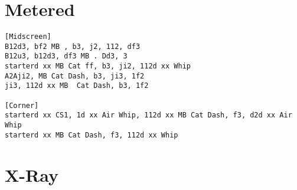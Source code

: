 \documentclass[main.tex]{subfiles}
\begin{document}
\section{Metered}


\begin{lstlisting}[language=FG]
[Midscreen]
B12d3, bf2 MB , b3, j2, 112, df3
B12u3, b12d3, df3 MB . Dd3, 3
starterd xx MB Cat ff, b3, ji2, 112d xx Whip
A2Aji2, MB Cat Dash, b3, ji3, 1f2
ji3, 112d xx MB  Cat Dash, b3, 1f2

[Corner]
starterd xx CS1, 1d xx Air Whip, 112d xx MB Cat Dash, f3, d2d xx Air Whip
starterd xx MB Cat Dash, f3, 112d xx Whip
\end{lstlisting}

\section{X-Ray}
\begin{lstlisting}[language=FG]

\end{lstlisting}
\end{document}

